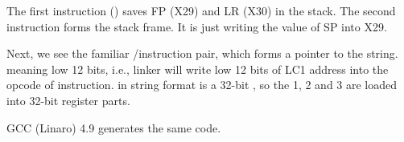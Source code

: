 


The first instruction  () saves \ac{FP} (X29) and \ac{LR} (X30) in the stack.
The second  instruction forms the stack frame.
It is just writing the value of \ac{SP} into X29.

Next, we see the familiar /\ADD instruction pair, which forms a pointer to the string.
 meaning low 12 bits, i.e., linker will write low 12 bits of LC1 address into the opcode of \ADD instruction.
 in \printf string format is a 32-bit \Tint, so the 1, 2 and 3 are loaded into 32-bit register parts.

\Optimizing GCC (Linaro) 4.9 generates the same code.

